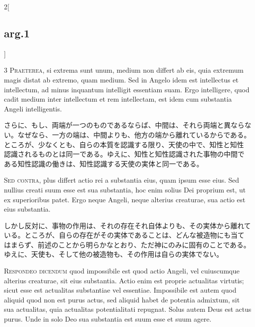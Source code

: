 \documentclass[paper=a4paper,fontsize=10pt,jafontsize=9pt,titlepage]{jlreq}
\begin{document}
\begin{paracol}{2}[\subsection{arg.1}]

{\scshape  3 Praeterea}, si extrema sunt unum, medium non differt ab
 eis, quia extremum magis distat ab extremo, quam medium. Sed in Angelo
 idem est intellectus et intellectum, ad minus inquantum intelligit
 essentiam suam. Ergo intelligere, quod cadit medium inter intellectum
 et rem intellectam, est idem cum substantia Angeli intelligentis.

\switchcolumn

さらに、もし、両端が一つのものであるならば、中間は、それら両端と異ならな
 い。なぜなら、一方の端は、中間よりも、他方の端から離れているからである。
 ところが、少なくとも、自らの本質を認識する限り、天使の中で、知性と知性
 認識されるものとは同一である。ゆえに、知性と知性認識された事物の中間で
 ある知性認識の働きは、知性認識する天使の実体と同一である。

\switchcolumn*[\subsection{s.c.}]

{\scshape  Sed contra,} plus differt actio rei a substantia eius, quam
 ipsum esse eius. Sed nullius creati suum esse est sua substantia, hoc
 enim solius Dei proprium est, ut ex superioribus patet. Ergo neque
 Angeli, neque alterius creaturae, sua actio est eius substantia.

\switchcolumn

しかし反対に、事物の作用は、それの存在それ自体よりも、その実体から離れて
 いる。ところが、自らの存在がその実体であることは、どんな被造物にも当て
 はまらず、前述のことから明らかなとおり、ただ神にのみに固有のことである。
ゆえに、天使も、そして他の被造物も、その作用は自らの実体でない。


{\scshape Respondeo dicendum} quod impossibile est quod actio Angeli,
 vel cuiuscumque alterius creaturae, sit eius substantia. Actio enim est
 proprie actualitas virtutis; sicut esse est actualitas substantiae vel
 essentiae. Impossibile est autem quod aliquid quod non est purus actus,
 sed aliquid habet de potentia admixtum, sit sua actualitas, quia
 actualitas potentialitati repugnat. Solus autem Deus est actus
 purus. Unde in solo Deo sua substantia est suum esse et suum
 agere.


\end{paracol}
\end{document}

